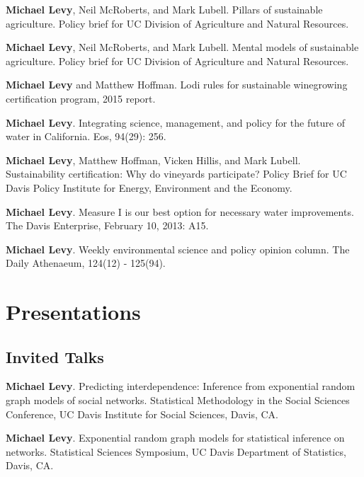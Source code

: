 \begin{description}
\tightlist
\item[2016]
\textbf{Michael Levy}, Neil McRoberts, and Mark Lubell. Pillars of
sustainable agriculture. Policy brief for UC Division of Agriculture and
Natural Resources.
\item[2016]
\textbf{Michael Levy}, Neil McRoberts, and Mark Lubell. Mental models of
sustainable agriculture. Policy brief for UC Division of Agriculture and
Natural Resources.
\item[2015]
\textbf{Michael Levy} and Matthew Hoffman. Lodi rules for sustainable
winegrowing certification program, 2015 report.
\item[2013]
\textbf{Michael Levy}. Integrating science, management, and policy for
the future of water in California. Eos, 94(29): 256.
\item[2013]
\textbf{Michael Levy}, Matthew Hoffman, Vicken Hillis, and Mark Lubell.
Sustainability certification: Why do vineyards participate? Policy Brief
for UC Davis Policy Institute for Energy, Environment and the Economy.
\item[2013]
\textbf{Michael Levy}. Measure I is our best option for necessary water
improvements. The Davis Enterprise, February 10, 2013: A15.
\item[2010 - 2012]
\textbf{Michael Levy}. Weekly environmental science and policy opinion
column. The Daily Athenaeum, 124(12) - 125(94).
\end{description}

\section{Presentations}\label{presentations}

\subsection{Invited Talks}\label{invited-talks}

\begin{description}
\tightlist
\item[2015]
\textbf{Michael Levy}. Predicting interdependence: Inference from
exponential random graph models of social networks. Statistical
Methodology in the Social Sciences Conference, UC Davis Institute for
Social Sciences, Davis, CA.
\item[2015]
\textbf{Michael Levy}. Exponential random graph models for statistical
inference on networks. Statistical Sciences Symposium, UC Davis
Department of Statistics, Davis, CA.
\end{description}

